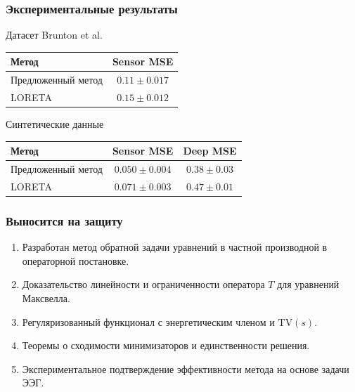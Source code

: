 \documentclass{beamer}
\begin{document}
\begin{frame}
\frametitle{Экспериментальные результаты}

\begin{block}{Датасет Brunton et al.}
\begin{table}[h]
\centering
\begin{tabular}{lc}
\hline
Метод & Sensor MSE \\
\hline
Предложенный метод & $0.11 \pm 0.017$\\
LORETA & $0.15 \pm 0.012$\\
\hline
\end{tabular}
\end{table}
\end{block}

\begin{block}{Синтетические данные}
\begin{table}[h]
\centering
\begin{tabular}{lcc}
\hline
Метод & Sensor MSE & Deep MSE \\
\hline
Предложенный метод & $0.050 \pm 0.004$ & $0.38 \pm 0.03$ \\
LORETA & $0.071 \pm 0.003$ & $0.47 \pm 0.01$ \\
\hline
\end{tabular}
\end{table}
\end{block}

\end{frame}

\begin{frame}

\frametitle{Выносится на защиту}

\begin{enumerate}
    \item Разработан метод обратной задачи уравнений в частной производной в операторной постановке.
    \item Доказательство линейности и ограниченности оператора $T$ для уравнений Максвелла.
    \item Регуляризованный функционал с энергетическим членом и $\mathrm{TV}(s)$.
    \item Теоремы о сходимости минимизаторов и единственности решения.
    \item Экспериментальное подтверждение эффективности метода на основе задачи ЭЭГ.
\end{enumerate}

\end{frame}
\end{document}
